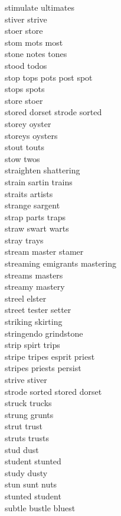 stimulate ultimates\\
stiver strive\\
stoer store\\
stom mots most\\
stone notes tones\\
stood todos\\
stop tops pots post spot\\
stops spots\\
store stoer\\
stored dorset strode sorted\\
storey oyster\\
storeys oysters\\
stout touts\\
stow twos\\
straighten shattering\\
strain sartin trains\\
straits artists\\
strange sargent\\
strap parts traps\\
straw swart warts\\
stray trays\\
stream master stamer\\
streaming emigrants mastering\\
streams masters\\
streamy mastery\\
streel elster\\
street tester setter\\
striking skirting\\
stringendo grindstone\\
strip spirt trips\\
stripe tripes esprit priest\\
stripes priests persist\\
strive stiver\\
strode sorted stored dorset\\
struck trucks\\
strung grunts\\
strut trust\\
struts trusts\\
stud dust\\
student stunted\\
study dusty\\
stun sunt nuts\\
stunted student\\
subtle bustle bluest\\
